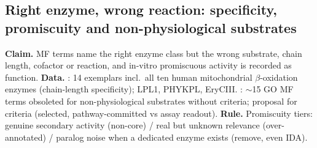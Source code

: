 \subsection{Right enzyme, wrong reaction: specificity, promiscuity and non-physiological substrates}\label{sec:dd-enzyme}
\textbf{Claim.} MF terms name the right enzyme class but the wrong substrate, chain length,
cofactor or reaction, and in-vitro promiscuous activity is recorded as function.
\textbf{Data.} : 14 exemplars incl.\ all ten human mitochondrial
$\beta$-oxidation enzymes (chain-length specificity); LPL1, PHYKPL, EryCIII.
: $\sim$15 GO MF terms obsoleted for non-physiological
substrates without criteria; proposal for criteria (selected, pathway-committed vs assay readout).
\textbf{Rule.} Promiscuity tiers: genuine secondary activity (non-core) / real but unknown
relevance (over-annotated) / paralog noise when a dedicated enzyme exists (remove, even IDA).
